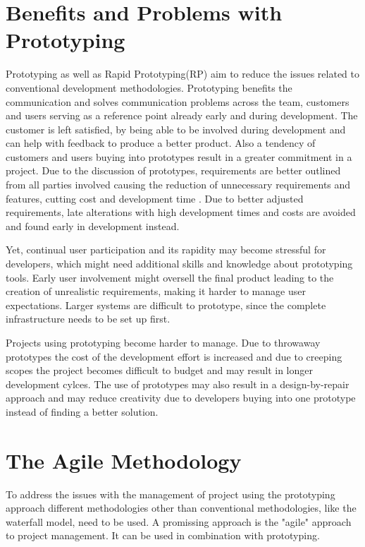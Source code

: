 \documentclass[runningheads]{llncs}
\begin{document}
\section{Benefits and Problems with Prototyping}
Prototyping as well as Rapid Prototyping(RP) aim to reduce the issues related to conventional development methodologies. Prototyping
benefits the communication and solves communication problems across the team, customers and users\cite{ref_RPalternativeStrategy} serving as a reference point already 
early and during development\cite{ref_prac}. The customer is left satisfied, by being able to be involved during development 
and can help with feedback to produce a better product. Also a tendency of customers and users buying into prototypes result in a greater
commitment in a project. Due to the discussion of prototypes, requirements are better outlined from all parties involved causing the reduction
of unnecessary requirements and features, cutting cost and development time \cite{ref_prac}. Due to better adjusted requirements, 
late alterations with high development times and costs are avoided and found early in development instead.

Yet, continual user participation and its rapidity may become stressful for developers, which might need additional skills and knowledge about
prototyping tools. Early user involvement might oversell the final product leading to the creation of unrealistic requirements, making it harder 
to manage user expectations. Larger systems are difficult to prototype, since the complete infrastructure needs to be set up first\cite{ref_prac}.

Projects using prototyping become harder to manage. Due to throwaway prototypes the cost of the development effort is increased 
and due to creeping scopes\cite{ref_featurecreep} the project becomes difficult to budget and may result in longer development cylces. 
The use of prototypes may also result in a design-by-repair approach and may reduce creativity due to developers buying into one 
prototype instead of finding a better solution.

\section{The Agile Methodology}
To address the issues with the management of project using the prototyping approach different methodologies other than 
conventional methodologies, like the waterfall model, need to be used. A promissing approach is the "agile" approach
to project management. It can be used in combination with prototyping.
\end{document}
